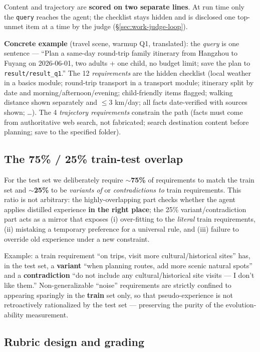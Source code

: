 \documentclass{article}
\begin{document}
Content and trajectory are \textbf{scored on two separate lines}. At run time only the \texttt{query} reaches the agent; the checklist stays hidden and is disclosed one top-unmet item at a time by the judge (\S\ref{sec:work-judge-loop}).

\textbf{Concrete example} (travel scene, warmup Q1, translated): the \emph{query} is one sentence --- ``Plan a same-day round-trip family itinerary from Hangzhou to Fuyang on 2026-06-01, two adults + one child, no budget limit; save the plan to \texttt{result/result\_q1}.'' The 12 \emph{requirements} are the hidden checklist (local weather in a basics module; round-trip transport in a transport module; itinerary split by date and morning/afternoon/evening; child-friendly items flagged; walking distance shown separately and $\leq 3$ km/day; all facts date-verified with sources shown; \dots). The 4 \emph{trajectory requirements} constrain the path (facts must come from authoritative web search, not fabricated; search destination content before planning; save to the specified folder).

\subsection{The 75\% / 25\% train-test overlap}

For the test set we deliberately require \textbf{$\sim$75\%} of requirements to match the train set and \textbf{$\sim$25\%} to be \emph{variants of} or \emph{contradictions to} train requirements. This ratio is not arbitrary: the highly-overlapping part checks whether the agent applies distilled experience \textbf{in the right place}; the 25\% variant/contradiction part acts as a mirror that exposes (i) over-fitting to the \emph{literal} train requirements, (ii) mistaking a temporary preference for a universal rule, and (iii) failure to override old experience under a new constraint.

Example: a train requirement ``on trips, visit more cultural/historical sites'' has, in the test set, a \textbf{variant} ``when planning routes, add more scenic natural spots'' and a \textbf{contradiction} ``do not include any cultural/historical site visits --- I don't like them.'' Non-generalizable ``noise'' requirements are strictly confined to appearing sparingly in the \textbf{train} set only, so that pseudo-experience is not retroactively rationalized by the test set --- preserving the purity of the evolution-ability measurement.

\subsection{Rubric design and grading}
\end{document}
